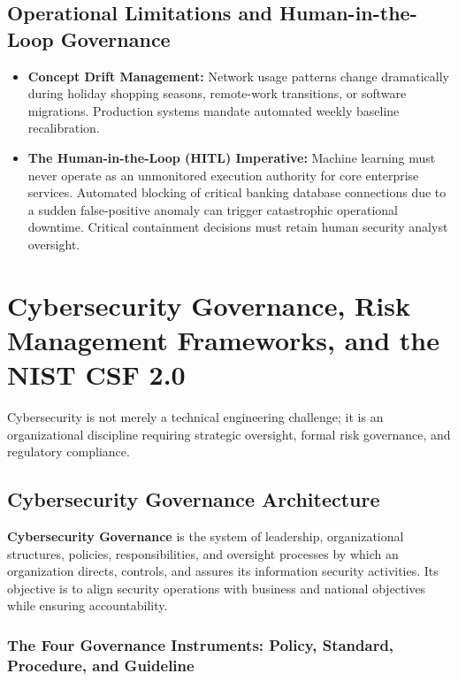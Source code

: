 \subsection{Operational Limitations and Human-in-the-Loop Governance}

\begin{itemize}
\item \textbf{Concept Drift Management:} Network usage patterns change dramatically during holiday shopping seasons, remote-work transitions, or software migrations. Production systems mandate automated weekly baseline recalibration.
\item \textbf{The Human-in-the-Loop (HITL) Imperative:} Machine learning must never operate as an unmonitored execution authority for core enterprise services. Automated blocking of critical banking database connections due to a sudden false-positive anomaly can trigger catastrophic operational downtime. Critical containment decisions must retain human security analyst oversight.
\end{itemize}



\newpage
\section{Cybersecurity Governance, Risk Management Frameworks, and the NIST CSF 2.0}

Cybersecurity is not merely a technical engineering challenge; it is an organizational discipline requiring strategic oversight, formal risk governance, and regulatory compliance.

\subsection{Cybersecurity Governance Architecture}

\textbf{Cybersecurity Governance} is the system of leadership, organizational structures, policies, responsibilities, and oversight processes by which an organization directs, controls, and assures its information security activities. Its objective is to align security operations with business and national objectives while ensuring accountability.

\subsubsection{The Four Governance Instruments: Policy, Standard, Procedure, and Guideline}

